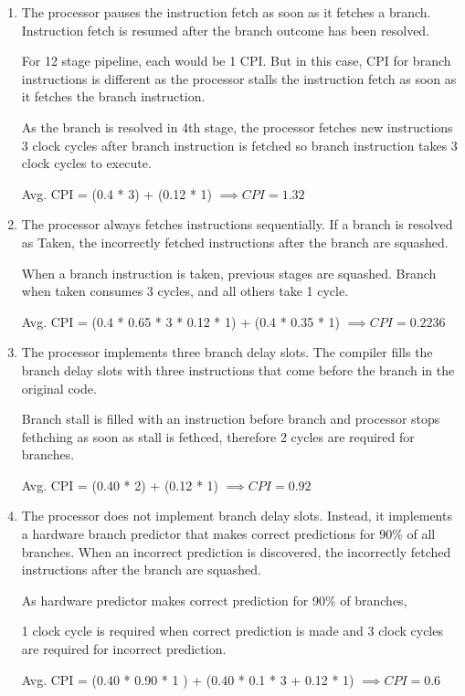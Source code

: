 \documentclass[11pt]{article}
\newenvironment{qparts}{\begin{enumerate}[{(}a{)}]}{\end{enumerate}}
\begin{document}
\begin{qparts}
    \item The processor pauses the instruction fetch as soon as it fetches a branch. Instruction fetch is resumed after the branch outcome has been resolved.

    For 12 stage pipeline, each would be 1 CPI.
    But in this case, CPI for branch instructions is different as the processor stalls the instruction fetch as soon as it fetches the branch instruction.

    As the branch is resolved in 4th stage, the processor fetches new instructions 3 clock cycles after branch instruction is fetched so branch instruction takes 3 clock cycles to execute.

    Avg. CPI = (0.4 * 3) + (0.12 * 1)
    $\implies CPI = 1.32$

    \item The processor always fetches instructions sequentially. If a branch is resolved as Taken, the incorrectly fetched instructions after the branch are squashed.
    
    When a branch instruction is taken, previous stages are squashed. Branch when taken consumes 3 cycles, and all others take 1 cycle.
    
    Avg. CPI = (0.4 * 0.65 * 3 * 0.12 * 1) + (0.4 * 0.35 * 1)
    $\implies CPI = 0.2236$

    \item The processor implements three branch delay slots. The compiler fills the branch delay slots with three instructions that come before the branch in the original code. 
    
    Branch stall is filled with an instruction before branch and processor stops fethching as soon as stall is fethced, therefore 2 cycles are required for branches.

    Avg. CPI = (0.40 * 2) + (0.12 * 1)
    $\implies CPI = 0.92$

    \item The processor does not implement branch delay slots. Instead, it implements a hardware branch predictor that makes correct predictions for 90\% of all branches. When an incorrect prediction is discovered, the incorrectly fetched instructions after the branch are squashed.
    
    As hardware predictor makes correct prediction for 90\% of branches,

    1 clock cycle is required when correct prediction is made and 3 clock cycles are required for incorrect prediction.

    Avg. CPI = (0.40 * 0.90 * 1 ) + (0.40 * 0.1 * 3 + 0.12 * 1)
    $\implies CPI = 0.6$
    
\end{qparts}
\end{document}
